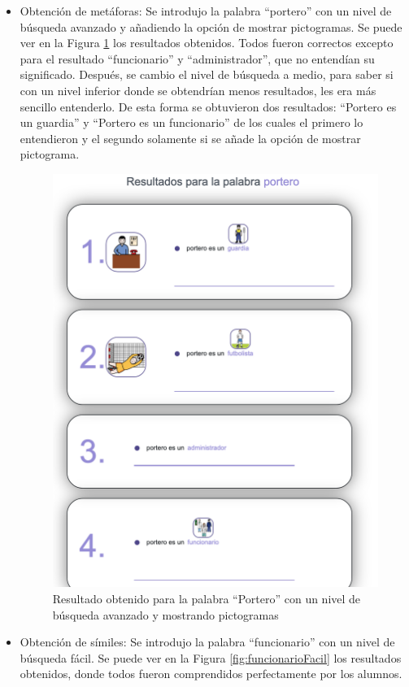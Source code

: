 \begin{itemize}
	\item Obtención de metáforas:  Se introdujo la palabra ``portero'' con un nivel de búsqueda avanzado y añadiendo la opción de mostrar pictogramas. Se puede ver en la Figura \ref{fig:porteroAvanzado} los resultados obtenidos. Todos fueron correctos excepto para el resultado ``funcionario'' y ``administrador'', que no entendían su significado. Después, se cambio el nivel de búsqueda a medio, para saber si con un nivel inferior donde se obtendrían menos resultados, les era más sencillo entenderlo. De esta forma se obtuvieron dos resultados: ``Portero es un guardia'' y ``Portero es un funcionario'' de los cuales el primero lo entendieron y el segundo solamente si se añade la opción de mostrar pictograma.
	
	\begin{figure}[!h]
		\includegraphics[width=.7\textwidth]{Imagenes/Bitmap/Capitulo4/EvaluacionFinal/7porteroavanzadopictos.png}
		\centering
		\caption{Resultado obtenido para la palabra ``Portero'' con un nivel de búsqueda avanzado y mostrando pictogramas}
		\label{fig:porteroAvanzado}
	\end{figure}
	
	\item  Obtención de símiles:  Se introdujo la palabra ``funcionario'' con un nivel de búsqueda fácil. Se puede ver en la Figura \ref{fig:funcionarioFacil} los resultados obtenidos, donde todos fueron comprendidos perfectamente por los alumnos. 
	

\end{itemize}
